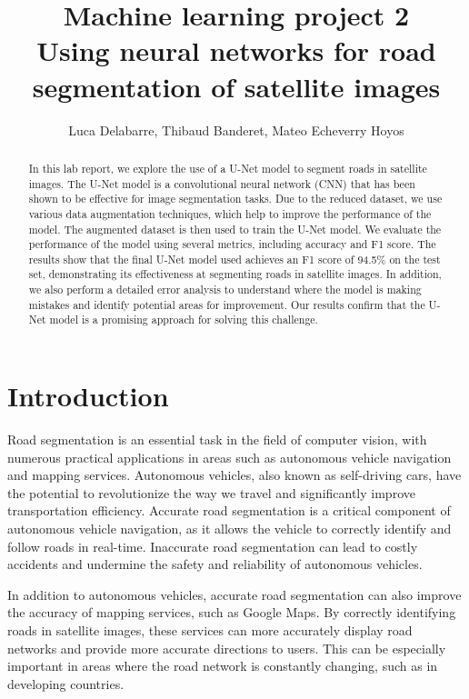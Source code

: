 \documentclass[10pt,conference,compsocconf]{IEEEtran}
\begin{document}
\title{\Large{Machine learning project 2\\
Using neural networks for road segmentation of satellite images}}

\author{Luca Delabarre, Thibaud Banderet, Mateo Echeverry Hoyos}

\maketitle

\begin{abstract}
In this lab report, we explore the use of a U-Net model to segment roads in satellite images. The U-Net model is a convolutional neural network (CNN) that has been shown to be effective for image segmentation tasks. Due to the reduced dataset, we use various data augmentation techniques, which help to improve the performance of the model. The augmented dataset is then used to train the U-Net model. We evaluate the performance of the model using several metrics, including accuracy and F1 score. The results show that the final U-Net model used achieves an F1 score of 94.5\% on the test set, demonstrating its effectiveness at segmenting roads in satellite images. In addition, we also perform a detailed error analysis to understand where the model is making mistakes and identify potential areas for improvement. Our results confirm that the U-Net model is a promising approach for solving this challenge.
\end{abstract}

\section{Introduction}
Road segmentation is an essential task in the field of computer vision, with numerous practical applications in areas such as autonomous vehicle navigation and mapping services. Autonomous vehicles, also known as self-driving cars, have the potential to revolutionize the way we travel and significantly improve transportation efficiency. Accurate road segmentation is a critical component of autonomous vehicle navigation, as it allows the vehicle to correctly identify and follow roads in real-time. Inaccurate road segmentation can lead to costly accidents and undermine the safety and reliability of autonomous vehicles.

In addition to autonomous vehicles, accurate road segmentation can also improve the accuracy of mapping services, such as Google Maps. By correctly identifying roads in satellite images, these services can more accurately display road networks and provide more accurate directions to users. This can be especially important in areas where the road network is constantly changing, such as in developing countries.
\end{document}
